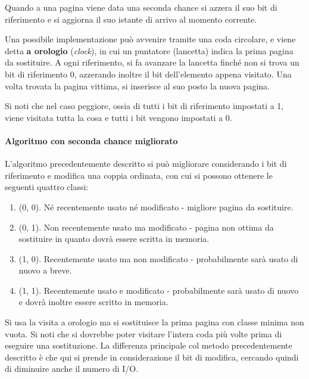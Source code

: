             Quando a una pagina viene data una seconda chance si azzera il suo bit di riferimento e si aggiorna il suo istante di arrivo al momento corrente.
            
            Una possibile implementazione può avvenire tramite una coda circolare, e viene detta \textbf{a orologio} (\textit{clock}), in cui un puntatore (lancetta) indica la prima pagina da sostituire. A ogni riferimento, si fa avanzare la lancetta finché non si trova un bit di riferimento 0, azzerando inoltre il bit dell'elemento appena visitato. Una volta trovata la pagina vittima, si inserisce al suo posto la nuova pagina.
            
            Si noti che nel caso peggiore, ossia di tutti i bit di riferimento impostati a 1, viene visitata tutta la cosa e tutti i bit vengono impostati a 0.
            
        \paragraph{Algoritmo con seconda chance migliorato}
            L'algoritmo precedentemente descritto si può migliorare considerando i bit di riferimento e modifica una coppia ordinata, con cui si possono ottenere le seguenti quattro classi:
            \begin{enumerate}
                \item (0, 0). Né recentemente usato né modificato - migliore pagina da sostituire.
                
                \item (0, 1). Non recentemente usato ma modificato - pagina non ottima da sostituire in quanto dovrà essere scritta in memoria.
                
                \item (1, 0). Recentemente usato ma non modificato - probabilmente sarà usato di nuovo a breve.
                
                \item (1, 1). Recentemente usato e modificato - probabilmente sarà usato di nuovo e dovrà inoltre essere scritto in memoria.
            \end{enumerate}
            
            Si usa la visita a orologio ma si sostituisce la prima pagina con classe minima non vuota. Si noti che si dovrebbe poter visitare l'intera coda più volte prima di eseguire una sostituzione. La differenza principale col metodo precedentemente descritto è che qui si prende in considerazione il bit di modifica, cercando quindi di diminuire anche il numero di I/O.
            
